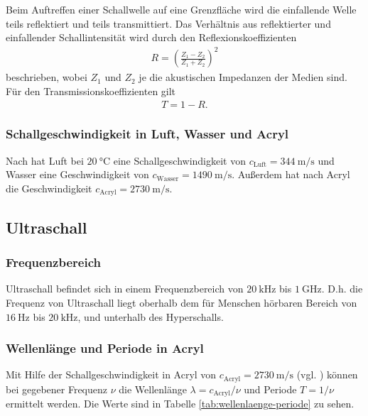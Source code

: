 \noindent
Beim Auftreffen einer Schallwelle auf eine Grenzfläche wird die einfallende Welle teils reflektiert und teils transmittiert.
Das Verhältnis aus reflektierter und einfallender Schallintensität wird durch den Reflexionskoeffizienten 
\begin{align}
    R = \left(\frac{Z_1 - Z_2}{Z_1 + Z_2}\right)^2
    \label{eq:reflexion}
\end{align}
beschrieben, wobei $Z_1$ und $Z_2$ je die akustischen Impedanzen der Medien sind.
Für den Transmissionskoeffizienten gilt 
\begin{align}
    T = 1 - R.
    \label{eq:transmission}
\end{align}


\subsubsection{Schallgeschwindigkeit in Luft, Wasser und Acryl}
\label{sec:schallgeschwindigkeit}
Nach \cite[]{schall-wasser-luft} hat Luft bei $\qty[]{20}{\celsius}$ eine Schallgeschwindigkeit von $c_\text{Luft} = \qty[]{344}{\meter\per\second}$
und Wasser eine Geschwindigkeit von $c_\text{Wasser} = \qty[]{1490}{\meter\per\second}$.
Außerdem hat nach \cite[]{schall-acryl} Acryl die Geschwindigkeit $c_\text{Acryl} = \qty[]{2730}{\meter\per\second}$.



\subsection{Ultraschall}

\subsubsection{Frequenzbereich}
Ultraschall befindet sich in einem Frequenzbereich von $\qty[]{20}{\kilo\hertz}$ bis $\qty[]{1}{\giga\hertz}$.
D.h. die Frequenz von Ultraschall liegt oberhalb dem für Menschen hörbaren Bereich von $\qty[]{16}{\hertz}$ bis $\qty[]{20}{\kilo\hertz}$,
und unterhalb des Hyperschalls.

\subsubsection{Wellenlänge und Periode in Acryl}
Mit Hilfe der Schallgeschwindigkeit in Acryl von $c_\text{Acryl} = \qty[]{2730}{\meter\per\second}$ (vgl. \cite[]{schall-acryl})
können bei gegebener Frequenz $\nu$ die Wellenlänge $\lambda  = c_\text{Acryl} / \nu$ und Periode $T = 1 / \nu$ ermittelt werden.
Die Werte sind in Tabelle \ref{tab:wellenlaenge-periode} zu sehen.

